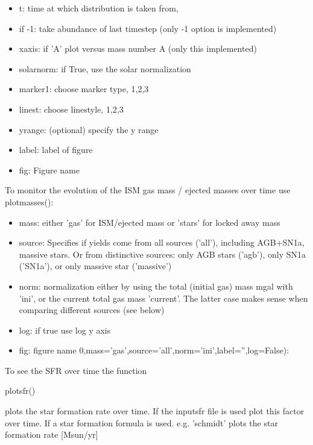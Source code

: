 {\begin{itemize}
\item t: time at which distribution is taken from, 
\item if -1: take abundance of last timestep (only -1 option is implemented)
\item x\textunderscore axis: if 'A' plot versus mass number A (only this implemented)		
\item solar\textunderscore norm: if True, use the solar normalization
\item marker1: choose marker type, 1,2,3
\item linest: choose linestyle, 1,2,3
\item y\textunderscore range: (optional) specify the y range
\item label: label of figure
\item fig: Figure name				
\end{itemize} 



To monitor the evolution of the ISM gas mass / ejected
masses over time use plot\textunderscore masses():

\begin{itemize} 

\item mass: either 'gas' for ISM/ejected mass or 'stars' for
		locked away mass
   \item source: Specifies if yields come from
            all sources ('all'), including
          AGB+SN1a, massive stars. Or from
          distinctive sources:
         only AGB stars ('agb'), only
          SN1a ('SN1a'), or only massive star ('massive')
\item norm: normalization either by using the total (initial gas)
                                mass mgal with 'ini', 
                                or the current total gas mass 'current'.
                                The latter case makes sense when comparing different
                                sources (see below)
\item log: if true use log y axis
\item fig: figure name
0,mass='gas',source='all',norm='ini',label='',log=False):

\end{itemize} 


To see the SFR over time the function
 


plot\textunderscore sfr()

plots the star formation rate
                        over time. If the input\textunderscore sfr file
                        is used plot this factor over time.
                        If a star formation formula is
                        used. e.g. 'schmidt' plots
                        the star formation rate [Msun/yr]


}
